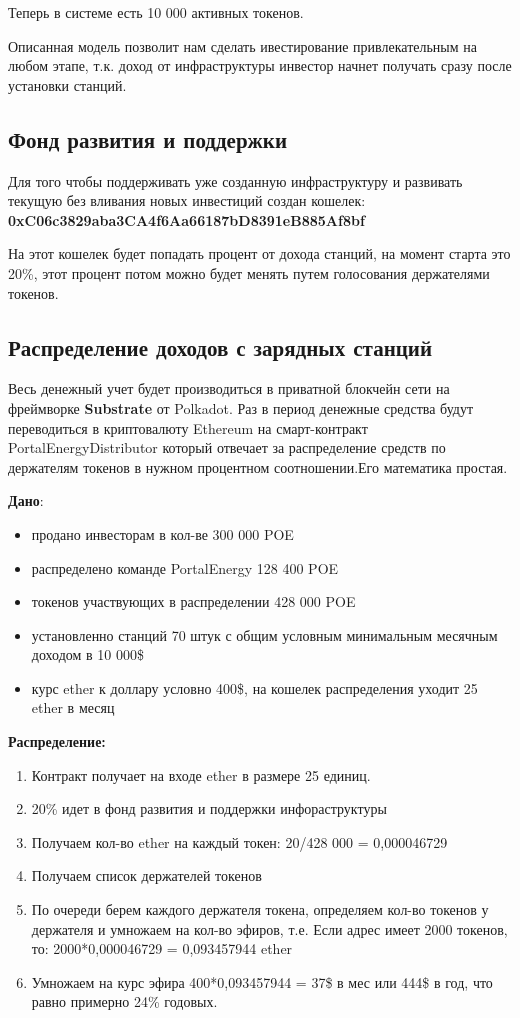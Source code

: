 \documentclass[a4paper,12pt]{report}
\begin{document}
Теперь в системе есть 10 000 активных токенов.

Описанная модель позволит нам сделать ивестирование привлекательным на любом этапе, т.к. доход от инфраструктуры инвестор начнет получать сразу после установки станций. 

\subsection{Фонд развития и поддержки}
Для того чтобы поддерживать уже созданную инфраструктуру и развивать текущую без вливания новых инвестиций создан кошелек: 
\textbf{0xC06c3829aba3CA4f6Aa66187bD8391eB885Af8bf}

На этот кошелек будет попадать процент от дохода станций, на момент старта это 20\%, этот процент потом можно будет менять путем голосования держателями токенов. 


\subsection{Распределение доходов с зарядных станций }
\label{capital}
Весь денежный учет будет производиться в приватной блокчейн сети на фреймворке \textbf{Substrate} от Polkadot. 
Раз в период денежные средства будут переводиться в криптовалюту Ethereum на смарт-контракт PortalEnergyDistributor который отвечает за распределение средств по держателям токенов в нужном процентном соотношении.Его математика простая.

\textbf{Дано}:



\begin{itemize}
	\item продано инвесторам в кол-ве 300 000 POE
	\item распределено команде PortalEnergy 128 400 POE
	\item токенов участвующих в распределении 428 000 POE
	\item установленно станций 70 штук с общим условным минимальным месячным доходом в 10 000\$
	\item курс ether к доллару условно 400\$,  на кошелек распределения уходит 25 ether в месяц
\end{itemize}

\textbf{Распределение:}

\begin{enumerate}
	\item Контракт получает на входе ether в размере 25 единиц.
	\item 20\% идет в фонд развития и поддержки инфораструктуры
	\item Получаем кол-во ether на каждый токен: 20/428 000 = 0,000046729
	\item Получаем список держателей токенов
	\item По очереди берем каждого держателя токена, определяем кол-во токенов у держателя и умножаем на кол-во эфиров, т.е. Если адрес имеет 2000 токенов, то: 2000*0,000046729 = 0,093457944 ether
	\item Умножаем на курс эфира 400*0,093457944 = 37\$ в мес или 444\$ в год, что равно примерно 24\% годовых. 
\end{enumerate}
\end{document}

